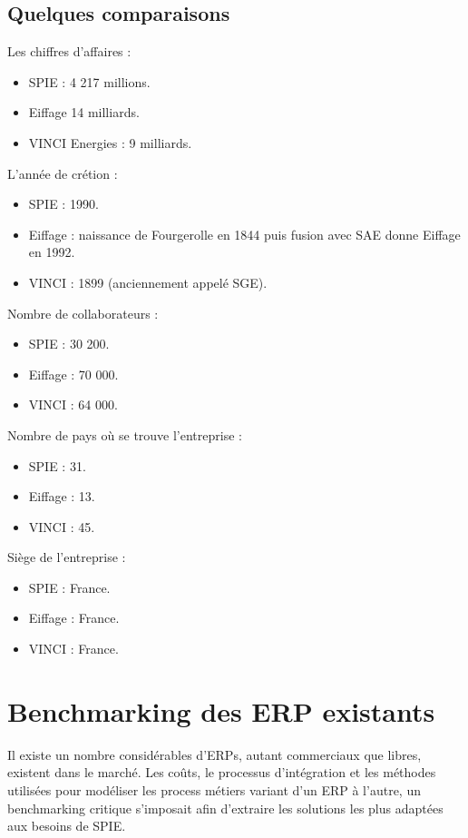 	\subsection{Quelques comparaisons}
Les chiffres d'affaires :
\begin {itemize}
	\item SPIE : 4 217 millions.
	\item Eiffage 14 milliards.
	\item VINCI Energies : 9 milliards.
\end{itemize}

L'année de crétion : 
\begin {itemize}
	\item SPIE : 1990.
	\item Eiffage : naissance de Fourgerolle en 1844 puis fusion avec SAE donne Eiffage en 1992.
	\item VINCI : 1899 (anciennement appelé SGE).
\end{itemize}

Nombre de collaborateurs :
\begin {itemize}
	\item SPIE : 30 200.
	\item Eiffage : 70 000.
	\item VINCI : 64 000.
\end{itemize}

Nombre de pays où se trouve l'entreprise :
\begin {itemize}
	\item SPIE : 31.
	\item Eiffage : 13.
	\item VINCI : 45.
\end{itemize}

Siège de l'entreprise :
\begin {itemize}
	\item SPIE : France.
	\item Eiffage : France.
	\item VINCI : France.
\end{itemize}


\section{Benchmarking des ERP existants}

    Il existe un nombre considérables d'ERPs, autant commerciaux que libres, existent dans le marché. Les coûts, le processus d'intégration et les méthodes utilisées pour modéliser les process métiers variant d'un ERP à l'autre, un benchmarking critique s'imposait afin d'extraire les solutions les plus adaptées aux besoins de SPIE.


